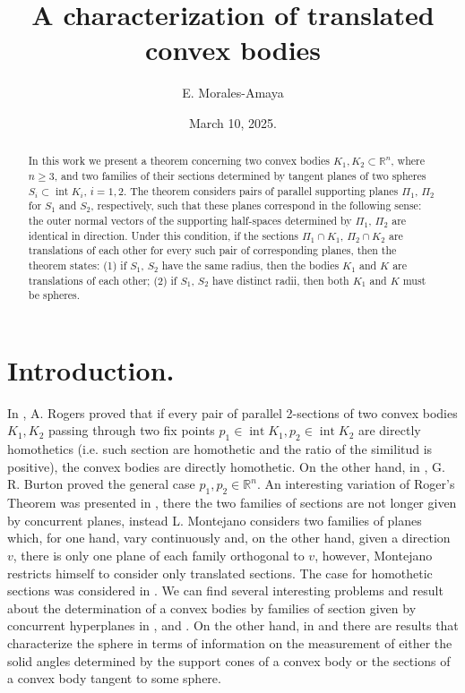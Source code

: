 \documentclass[12pt]{amsart}
\title{A characterization of translated convex bodies}
\author{E. Morales-Amaya \\
}
\date{March 10, 2025.}
\newcommand{\inte}{\operatorname*{int}}
\begin{document}
\maketitle

\begin{abstract} In this work we present a theorem concerning two convex bodies $K_1, K_2\subset \mathbb{R}^{n}$, where $n\geq 3$, and two families of their sections determined by tangent planes of two spheres 
$S_i\subset \inte K_i$, $i=1,2$. The theorem considers pairs of parallel supporting planes $\Pi_1$, $\Pi_2$ for $S_1$ and $S_2$, respectively, 
such that these planes correspond in the following sense: the outer normal vectors of the supporting half-spaces determined by $\Pi_1$, $\Pi_2$ are identical in direction. Under this condition, if the sections $\Pi_1\cap K_1$, $\Pi_2\cap K_2$ are translations of each other for every such pair of corresponding planes, then the theorem states: (1) if $S_1$, $S_2$ have the same radius, then the bodies $K_1$ and $K$ are translations of each other; (2) if $S_1$, $S_2$ have distinct radii, then both $K_1$ and $K$ must be spheres.
 \end{abstract}
\section{Introduction.}  
In \cite{ro1}, A. Rogers proved that if every pair of parallel 2-sections of two convex bo\-dies $K_1,K_2$ passing through two fix points $p_1\in \inte K_1, p_2\in \inte K_2$ are directly homothetics (i.e. such section are homothetic and the ratio of the similitud is positive), the convex bo\-dies are directly homo\-thetic. On the other hand, in \cite {burton}, G. R. Burton proved the general case $p_1, p_2\in  \mathbb{R}^{n}$. An interesting variation of Roger's Theorem was presented in \cite{mo}, there the two families of sections are not longer given by concurrent planes, instead L. Montejano considers two families of planes which, for one hand, vary continuously and, on the other hand, given a direction $v$, there is only one plane of each family orthogonal to $v$, however, Montejano restricts himself to consider only translated sections. The case for homothetic sections was considered in \cite{jmm2}. We can find several interesting problems and result about the determination of a convex bodies by families of section given by concurrent hyperplanes 
in \cite{bl}, \cite{gardner} and \cite{dima}. On the other hand, in \cite{kuru1} and \cite{kuru2} there are results that characterize the sphere in terms of information on the measurement of either the solid angles determined by the support cones of a convex body or the sections of a convex body tangent to some sphere.
\end{document}
